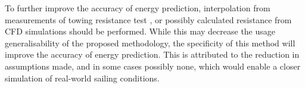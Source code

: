 To further improve the accuracy of energy prediction, interpolation from measurements of towing resistance test , or possibly calculated resistance from CFD simulations should be performed. While this may decrease the usage generalisability of the proposed methodology, the specificity of this method will improve the accuracy of energy prediction. This is attributed to the reduction in assumptions made, and in some cases possibly none, which would enable a closer simulation of real-world sailing conditions.\\














